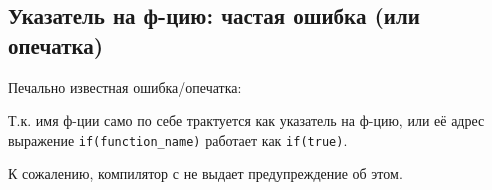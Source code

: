 \subsection{Указатель на ф-цию: частая ошибка (или опечатка)}

Печально известная ошибка/опечатка:



Т.к. имя ф-ции само по себе трактуется как указатель на ф-цию, или её адрес
выражение \verb|if(function_name)| работает как \verb|if(true)|.

К сожалению, компилятор с \CCpp не выдает предупреждение об этом.


